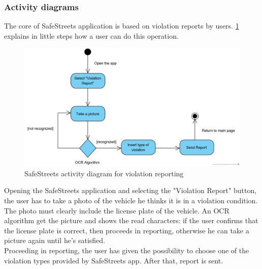 \documentclass{article}
\begin{document}
			\subsubsection{Activity diagrams}
			The core of SafeStreets application is based on violation reports by users. \figurename{ \ref{fig:activitydiagram_report}} explains in little steps how a user can do this operation.
			\begin{figure}[H]
				\centering
				\includegraphics[width=1\textwidth]{diagrams/activity_report.png}
				\caption[SafeStreets activity diagram]{SafeStreets activity diagram for violation reporting}
				\label{fig:activitydiagram_report}
			\end{figure} 
			Opening the SafeStreets application and selecting the "Violation Report" button, the user has to take a photo of the vehicle he thinks it is in a violation condition. The photo must clearly include the license plate of the vehicle.
			An OCR algorithm get the picture and shows the read characters: if the user confirms that the license plate is correct, then proceeds in reporting, otherwise he can take a picture again until he's satisfied.\\
			Proceeding in reporting, the user has given the possibility to choose one of the violation types provided by SafeStreets app. After that, report is sent.\\
			
\end{document}

